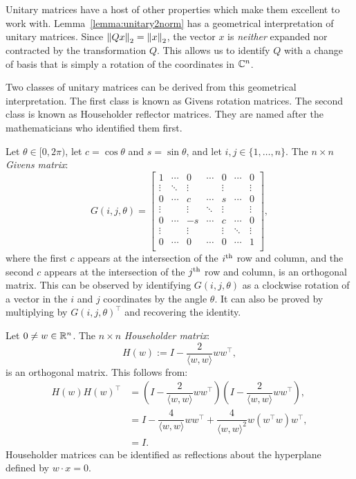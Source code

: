 Unitary matrices have a host of other properties which make them excellent to work with. Lemma~\ref{lemma:unitary2norm} has a geometrical interpretation of unitary matrices. Since $\left\|{Qx}\right\|_2 = \left\|{x}\right\|_2$, the vector $x$ is {\em neither} expanded nor contracted by the transformation $Q$. This allows us to identify $Q$ with a change of basis that is simply a rotation of the coordinates in $\mathbb{C}^n$.

Two classes of unitary matrices can be derived from this geometrical interpretation. The first class is known as Givens rotation matrices. The second class is known as Householder reflector matrices. They are named after the mathematicians who identified them first.

\begin{example}
Let $\theta\in[0,2\pi)$, let $c = \cos\theta$ and $s=\sin\theta$, and let $i,j\in\{1,\ldots,n\}$. The $n\times n$ {\em Givens matrix}:
\[
G(i,j,\theta) = \begin{bmatrix}
1 & \cdots & 0 & \cdots & 0 & \cdots & 0\\
\vdots & \ddots & \vdots & & \vdots & & \vdots\\
0 & \cdots & c & \cdots & s & \cdots & 0\\
\vdots & & \vdots & \ddots & \vdots & & \vdots\\
0 & \cdots & -s & \cdots & c & \cdots & 0\\
\vdots & & \vdots & & \vdots & \ddots & \vdots\\
0 & \cdots & 0 & \cdots & 0 & \cdots & 1\\
\end{bmatrix},
\]
where the first $c$ appears at the intersection of the $i^{\rm th}$ row and column, and the second $c$ appears at the intersection of the $j^{\rm th}$ row and column, is an orthogonal matrix. This can be observed by identifying $G(i,j,\theta)$ as a clockwise rotation of a vector in the $i$ and $j$ coordinates by the angle $\theta$. It can also be proved by multiplying by $G(i,j,\theta)^\top$ and recovering the identity.
\end{example}

\begin{example}
Let $0\ne w\in\mathbb{R}^n$. The $n\times n$ {\em Householder matrix}:
\[
H(w) := I - \dfrac{2}{\langle w,w\rangle} ww^\top,
\]
is an orthogonal matrix. This follows from:
\begin{align*}
H(w)H(w)^\top & = \left(I - \dfrac{2}{\langle w,w\rangle} ww^\top\right)\left(I - \dfrac{2}{\langle w,w\rangle} ww^\top\right),\\
& = I - \dfrac{4}{\langle w,w\rangle}ww^\top + \dfrac{4}{\langle w,w\rangle^2}w (w^\top w)w^\top,\\
& = I.
\end{align*}
Householder matrices can be identified as reflections about the hyperplane defined by $w\cdot x = 0$.
\end{example}

